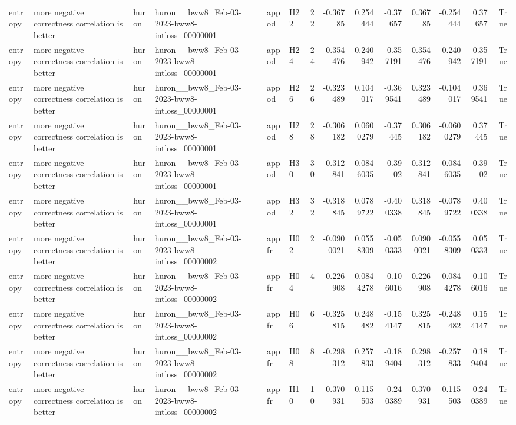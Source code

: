 \begin{longtable}{llllllrrrrrrrr}
entropy & more negative correctness correlation is better & huron & huron\_\_bww8\_Feb-03-2023-bww8-intloss\_00000001 & appod & H22 & 22 & -0.36785 & 0.254444 & -0.37657 & 0.36785 & -0.254444 & 0.37657 & True \\
entropy & more negative correctness correlation is better & huron & huron\_\_bww8\_Feb-03-2023-bww8-intloss\_00000001 & appod & H24 & 24 & -0.354476 & 0.240942 & -0.357191 & 0.354476 & -0.240942 & 0.357191 & True \\
entropy & more negative correctness correlation is better & huron & huron\_\_bww8\_Feb-03-2023-bww8-intloss\_00000001 & appod & H26 & 26 & -0.323489 & 0.104017 & -0.369541 & 0.323489 & -0.104017 & 0.369541 & True \\
entropy & more negative correctness correlation is better & huron & huron\_\_bww8\_Feb-03-2023-bww8-intloss\_00000001 & appod & H28 & 28 & -0.306182 & 0.0600279 & -0.37445 & 0.306182 & -0.0600279 & 0.37445 & True \\
entropy & more negative correctness correlation is better & huron & huron\_\_bww8\_Feb-03-2023-bww8-intloss\_00000001 & appod & H30 & 30 & -0.312841 & 0.0846035 & -0.3902 & 0.312841 & -0.0846035 & 0.3902 & True \\
entropy & more negative correctness correlation is better & huron & huron\_\_bww8\_Feb-03-2023-bww8-intloss\_00000001 & appod & H32 & 32 & -0.318845 & 0.0789722 & -0.400338 & 0.318845 & -0.0789722 & 0.400338 & True \\
entropy & more negative correctness correlation is better & huron & huron\_\_bww8\_Feb-03-2023-bww8-intloss\_00000002 & appfr & H02 & 2 & -0.0900021 & 0.0558309 & -0.050333 & 0.0900021 & -0.0558309 & 0.050333 & True \\
entropy & more negative correctness correlation is better & huron & huron\_\_bww8\_Feb-03-2023-bww8-intloss\_00000002 & appfr & H04 & 4 & -0.226908 & 0.0844278 & -0.106016 & 0.226908 & -0.0844278 & 0.106016 & True \\
entropy & more negative correctness correlation is better & huron & huron\_\_bww8\_Feb-03-2023-bww8-intloss\_00000002 & appfr & H06 & 6 & -0.325815 & 0.248482 & -0.154147 & 0.325815 & -0.248482 & 0.154147 & True \\
entropy & more negative correctness correlation is better & huron & huron\_\_bww8\_Feb-03-2023-bww8-intloss\_00000002 & appfr & H08 & 8 & -0.298312 & 0.257833 & -0.189404 & 0.298312 & -0.257833 & 0.189404 & True \\
entropy & more negative correctness correlation is better & huron & huron\_\_bww8\_Feb-03-2023-bww8-intloss\_00000002 & appfr & H10 & 10 & -0.370931 & 0.115503 & -0.240389 & 0.370931 & -0.115503 & 0.240389 & True \\

\end{longtable}
